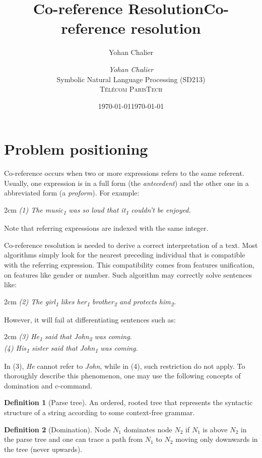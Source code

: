\documentclass[a4paper]{article}
\title{Co-reference Resolution}
\author{Yohan Chalier}
\date{\today}
\title{Co-reference resolution}
\date{\today}
\author{\textit{Yohan Chalier}\\ Symbolic Natural Language Processing (SD213) \\ \textsc{Télécom ParisTech}}
\theoremstyle{definition}
\newtheorem{definition}{Definition}[section]
\newcommand{\sub}[1]{\textsubscript{#1}}
\newenvironment{sentence}{\vspace{.1cm}\begin{adjustwidth}{2cm}{}\em}{\end{adjustwidth}\vspace{.1cm}}
\begin{document}
\maketitle

\section{Problem positioning}

Co-reference occurs when two or more expressions refers to the same referent. Usually, one expression is in a full form (the \emph{antecedent}) and the other one in a abbreviated form (a \emph{proform}). For example:
\begin{sentence}
(1) The music\sub{1} was so loud that it\sub{1} couldn't be enjoyed.
\end{sentence}
Note that referring expressions are indexed with the same integer.

Co-reference resolution is needed to derive a correct interpretation of a text. Most algorithms simply look for the nearest preceding individual that is compatible with the referring expression. This compatibility comes from features unification, on features like gender or number. Such algorithm may correctly solve sentences like:
\begin{sentence}
(2) The girl\sub{1} likes her\sub{1} brother\sub{2} and protects him\sub{2}.
\end{sentence}
However, it will fail at differentiating sentences such as:
\begin{sentence}
(3) He\sub{1} said that John\sub{2} was coming. \\
(4) His\sub{1} sister said that John\sub{1} was coming.
\end{sentence}
In (3), \emph{He} cannot refer to \emph{John}, while in (4), such restriction do not apply. To thoroughly describe this phenomenon, one may use the following concepts of domination and c-command.

\begin{definition}[Parse tree]
An ordered, rooted tree that represents the syntactic structure of a string according to some context-free grammar.
\end{definition}

\begin{definition}[Domination]
Node $N_1$ dominates node $N_2$ if $N_1$ is above $N_2$ in the parse tree and one can trace a path from $N_1$ to $N_2$ moving only downwards in the tree (never upwards).
\end{definition}
\end{document}
